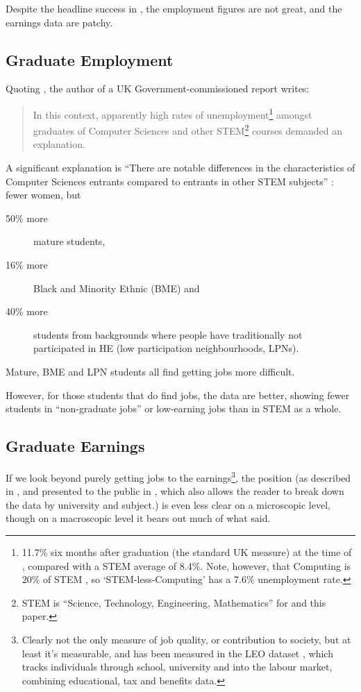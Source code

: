 \documentclass[sigconf,anonymous]{acmart}
\begin{document}
Despite the headline success in \cite{BIS2011a}, the employment
figures are not great, and the earnings data are patchy.

\subsection{Graduate Employment}

Quoting \cite{UKCES2015b}, the author of a UK Government-commissioned
report \cite{Shadbolt2016a} writes:

\begin{quote} In this context, apparently high rates of
unemployment\footnote{11.7\% six months after graduation (the standard
UK measure) at the time of \cite{Shadbolt2016a}, compared with a STEM
average of 8.4\%. Note, however, that Computing is 20\% of STEM
\cite[Table 1]{Wakeham2016a}, so `STEM-less-Computing' has a 7.6\%
unemployment rate.} amongst graduates of Computer Sciences and other
STEM\footnote{STEM is ``Science, Technology, Engineering,
Mathematics'' for \cite{Shadbolt2016a} and this paper.} courses
demanded an explanation.
\end{quote}

A significant explanation is ``There are notable differences in the
characteristics of Computer Sciences entrants compared to entrants in
other STEM subjects'' \cite[\P2.6]{Shadbolt2016a}: fewer women, but

\begin{description}
\item[50\% more] mature students,
\item[16\% more] Black and Minority Ethnic (BME) and
\item[40\% more] students from backgrounds where people have
traditionally not participated in HE (low participation
neighbourhoods, LPNs).
\end{description}

Mature, BME and LPN students all find getting jobs more difficult.
\par However, for those students that do find jobs, the data are
better, showing \cite[Figure 6]{Shadbolt2016a} fewer students in
``non-graduate jobs'' or low-earning jobs than in STEM as a whole.

\subsection{Graduate Earnings}
If we look beyond purely getting jobs to the earnings\footnote{Clearly
not the only measure of job quality, or contribution to society, but
at least it's measurable, and has been measured in the LEO dataset
\cite{DfE2017a}, which tracks individuals through school, university
and into the labour market, combining educational, tax and benefits
data.}, the position (as described in \cite{DfE2018d}, and presented
to the public in \cite{BBC2018f}, which also allows the reader to
break down the data by university and subject.) is even less clear on
a microscopic level, though on a macroscopic level it bears out much
of what \cite{Shadbolt2016a} said.
\end{document}
